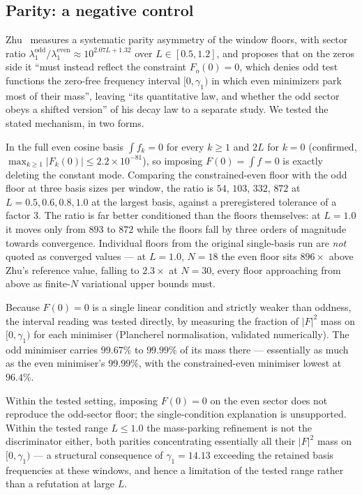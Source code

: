 \subsection{Parity: a negative control}\label{ssec:pdsparity}

Zhu~\cite{Zhu} measures a systematic parity asymmetry of the window floors, with sector
ratio $\lambda^{\mathrm{odd}}_1/\lambda^{\mathrm{even}}_1\approx10^{2.07L+1.32}$ over
$L\in[0.5,1.2]$, and proposes that on the zeros side it ``must instead reflect the
constraint $F_o(0)=0$, which denies odd test functions the zero-free frequency interval
$[0,\gamma_1)$ in which even minimizers park most of their mass'', leaving ``its
quantitative law, and whether the odd sector obeys a shifted version'' of his decay law to
a separate study. We tested the stated mechanism, in two forms.

In the full even cosine basis $\int f_k=0$ for every $k\ge1$ and $2L$ for $k=0$ (confirmed,
$\max_{k\ge1}|F_k(0)|\le2.2\times10^{-81}$), so imposing $F(0)=\int f=0$ is exactly deleting
the constant mode. Comparing the constrained-even floor with the odd floor at three basis
sizes per window, the ratio is $54$, $103$, $332$, $872$ at $L=0.5,0.6,0.8,1.0$ at the
largest basis, against a preregistered tolerance of a factor $3$. The ratio is far better
conditioned than the floors themselves: at $L=1.0$ it moves only from $893$ to $872$ while
the floors fall by three orders of magnitude towards convergence. Individual floors from the
original single-basis run are \emph{not} quoted as converged values --- at $L=1.0$, $N=18$
the even floor sits $896\times$ above Zhu's reference value, falling to $2.3\times$ at
$N=30$, every floor approaching from above as finite-$N$ variational upper bounds must.

Because $F(0)=0$ is a single linear condition and strictly weaker than oddness, the interval
reading was tested directly, by measuring the fraction of $|F|^{2}$ mass on $[0,\gamma_1)$
for each minimiser (Plancherel normalisation, validated numerically). The odd minimiser
carries $99.67\%$ to $99.99\%$ of its mass there --- essentially as much as the even
minimiser's $99.99\%$, with the constrained-even minimiser lowest at $96.4\%$.

\begin{observation}[scoped]\label{pds:parity}
Within the tested setting, imposing $F(0)=0$ on the even sector does not reproduce the
odd-sector floor; the single-condition explanation is unsupported. Within the tested range
$L\le1.0$ the mass-parking refinement is not the discriminator either, both parities
concentrating essentially all their $|F|^{2}$ mass on $[0,\gamma_1)$ --- a structural
consequence of $\gamma_1=14.13$ exceeding the retained basis frequencies at these windows,
and hence a limitation of the tested range rather than a refutation at large $L$.
\end{observation}


